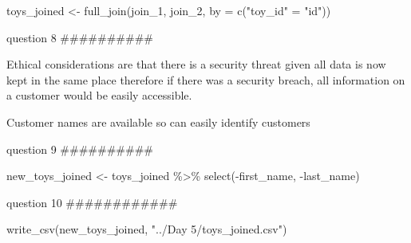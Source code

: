 \documentclass[
]{article}
\newenvironment{Shaded}{\begin{snugshade}}{\end{snugshade}}
\newcommand{\AttributeTok}[1]{\textcolor[rgb]{0.77,0.63,0.00}{#1}}
\newcommand{\FunctionTok}[1]{\textcolor[rgb]{0.00,0.00,0.00}{#1}}
\newcommand{\NormalTok}[1]{#1}
\newcommand{\OtherTok}[1]{\textcolor[rgb]{0.56,0.35,0.01}{#1}}
\newcommand{\SpecialCharTok}[1]{\textcolor[rgb]{0.00,0.00,0.00}{#1}}
\newcommand{\StringTok}[1]{\textcolor[rgb]{0.31,0.60,0.02}{#1}}
\begin{document}
\begin{Shaded}
\begin{Highlighting}[]
\NormalTok{toys\_joined }\OtherTok{\textless{}{-}} \FunctionTok{full\_join}\NormalTok{(join\_1, join\_2, }\AttributeTok{by =} \FunctionTok{c}\NormalTok{(}\StringTok{"toy\_id"} \OtherTok{=} \StringTok{"id"}\NormalTok{))}
\end{Highlighting}
\end{Shaded}

question 8 \#\#\#\#\#\#\#\#\#\#

Ethical considerations are that there is a security threat given all
data is now kept in the same place therefore if there was a security
breach, all information on a customer would be easily accessible.

Customer names are available so can easily identify customers

question 9 \#\#\#\#\#\#\#\#\#\#

\begin{Shaded}
\begin{Highlighting}[]
\NormalTok{new\_toys\_joined }\OtherTok{\textless{}{-}}\NormalTok{ toys\_joined }\SpecialCharTok{\%\textgreater{}\%} 
  \FunctionTok{select}\NormalTok{(}\SpecialCharTok{{-}}\NormalTok{first\_name, }\SpecialCharTok{{-}}\NormalTok{last\_name)}
\end{Highlighting}
\end{Shaded}

question 10 \#\#\#\#\#\#\#\#\#\#\#\#

\begin{Shaded}
\begin{Highlighting}[]
\FunctionTok{write\_csv}\NormalTok{(new\_toys\_joined, }\StringTok{"../Day 5/toys\_joined.csv"}\NormalTok{)}
\end{Highlighting}
\end{Shaded}
\end{document}
